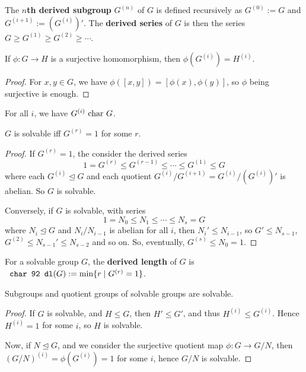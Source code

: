 \documentclass{article}
\begin{document}
\begin{definition}
    The \textbf{$n$th derived subgroup} $G^{(n)}$ of $G$ is defined recursively as $G^{(0)}:= G$ and $G^{(i+1)} := (G^{(i)})'$. The \textbf{derived series} of $G$ is then the series  $G\geq G^{(1)} \geq G^{(2)} \geq \cdots$.
\end{definition}

\begin{proposition}
    If $\phi:G\rightarrow H$ is a surjective homomorphism, then $\phi(G^{(i)}) = H^{(i)}$.\begin{proof}
        For $x,y\in G$, we have $\phi([x,y]) = [\phi(x),\phi(y)]$, so $\phi$ being surjective is enough.
    \end{proof}
\end{proposition}

\begin{corollary}
    For all $i$, we have $G^{(i)}\text{ char } G$.
\end{corollary}

\begin{proposition}
    $G$ is solvable iff $G^{(r)} = 1$ for some $r$.
    \begin{proof}
        If $G^{(r)}=1$, the consider the derived series \[
        1 = G^{(r)} \leq G^{(r-1)} \leq \cdots \leq G^{(1)} \leq G
        \] where each $G^{(i)}\unlhd G$ and each quotient $G^{(i)}/G^{(i+1)} = G^{(i)}/(G^{(i)})'$ is abelian. So $G$ is solvable.

        Conversely, if $G$ is solvable, with series \[
        1 = N_0 \leq N_1 \leq \cdots \leq N_s = G
        \] where $N_i\unlhd G$ and $N_i/N_{i-1}$ is abelian for all $i$, then $N_i'\leq N_{i-1}$, so $G'\leq N_{s-1}$, $G^{(2)} \leq N_{s-1}' \leq N_{s-2}$ and so on. So, eventually, $G^{(s)} \leq N_0 = 1$.
    \end{proof}
\end{proposition}

\begin{definition}
    For a solvable group $G$, the \textbf{derived length} of $G$ is $\dl(G):=\min\{r \mid G^{(r)}=1\}$.
\end{definition}

\begin{lemma}
    Subgroups and quotient groups of solvable groups are solvable.
    \begin{proof}
        If $G$ is solvable, and $H\leq G$, then $H'\leq G'$, and thus $H^{(i)}\leq G^{(i)}$. Hence $H^{(i)} = 1$ for some $i$, so $H$ is solvable.

        Now, if $N\unlhd G$, and we consider the surjective quotient map $\phi:G\rightarrow G/N$, then $(G/N)^{(i)} = \phi(G^{(i)}) = 1$ for some $i$, hence $G/N$ is solvable.
    \end{proof}
\end{lemma}
\end{document}

